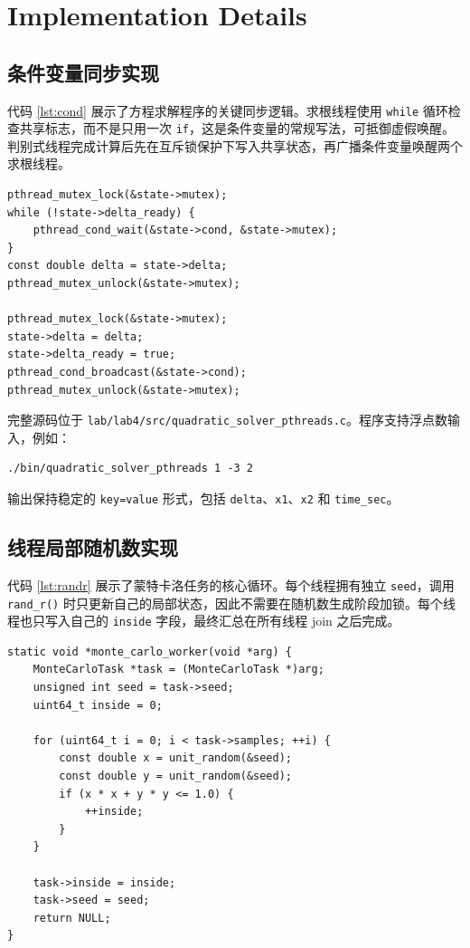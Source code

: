 \documentclass[UTF8,a4paper,12pt,fontset=none]{ctexart}
\begin{document}
\section{Implementation Details}

\subsection{条件变量同步实现}

代码 \ref{lst:cond} 展示了方程求解程序的关键同步逻辑。求根线程使用 \texttt{while} 循环检查共享标志，而不是只用一次 \texttt{if}，这是条件变量的常规写法，可抵御虚假唤醒。判别式线程完成计算后先在互斥锁保护下写入共享状态，再广播条件变量唤醒两个求根线程。

\begin{lstlisting}[style=cstyle,caption={条件变量同步核心代码},label={lst:cond}]
pthread_mutex_lock(&state->mutex);
while (!state->delta_ready) {
    pthread_cond_wait(&state->cond, &state->mutex);
}
const double delta = state->delta;
pthread_mutex_unlock(&state->mutex);

pthread_mutex_lock(&state->mutex);
state->delta = delta;
state->delta_ready = true;
pthread_cond_broadcast(&state->cond);
pthread_mutex_unlock(&state->mutex);
\end{lstlisting}

完整源码位于 \texttt{lab/lab4/src/quadratic\_solver\_pthreads.c}。程序支持浮点数输入，例如：
\begin{lstlisting}[style=cstyle]
./bin/quadratic_solver_pthreads 1 -3 2
\end{lstlisting}
输出保持稳定的 \texttt{key=value} 形式，包括 \texttt{delta}、\texttt{x1}、\texttt{x2} 和 \texttt{time\_sec}。

\subsection{线程局部随机数实现}

代码 \ref{lst:randr} 展示了蒙特卡洛任务的核心循环。每个线程拥有独立 \texttt{seed}，调用 \texttt{rand\_r()} 时只更新自己的局部状态，因此不需要在随机数生成阶段加锁。每个线程也只写入自己的 \texttt{inside} 字段，最终汇总在所有线程 join 之后完成。

\begin{lstlisting}[style=cstyle,caption={蒙特卡洛线程局部采样核心代码},label={lst:randr}]
static void *monte_carlo_worker(void *arg) {
    MonteCarloTask *task = (MonteCarloTask *)arg;
    unsigned int seed = task->seed;
    uint64_t inside = 0;

    for (uint64_t i = 0; i < task->samples; ++i) {
        const double x = unit_random(&seed);
        const double y = unit_random(&seed);
        if (x * x + y * y <= 1.0) {
            ++inside;
        }
    }

    task->inside = inside;
    task->seed = seed;
    return NULL;
}
\end{lstlisting}
\end{document}
